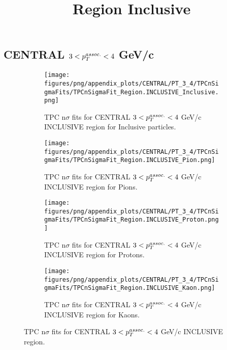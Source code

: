     
            \subsection{CENTRAL $3 < \pTassoc < 4$ GeV/c}
            \begin{figure}[H]
                \title{Region Inclusive}
                \begin{subfigure}[b]{0.5\textwidth}
                    \centering
                    \texttt{[image: figures/png/appendix\_plots/CENTRAL/PT\_3\_4/TPCnSigmaFits/TPCnSigmaFit\_Region.INCLUSIVE\_Inclusive.png]}
                    \caption{TPC n$\sigma$ fits for CENTRAL $3 < \pTassoc < 4$ GeV/c INCLUSIVE region for Inclusive particles.}
                    \label{fig:appendix_CENTRAL_$3 < \pTassoc < 4$ GeV/c_INCLUSIVE_Inclusive}
                \end{subfigure}
                \begin{subfigure}[b]{0.5\textwidth}
                    \centering
                    \texttt{[image: figures/png/appendix\_plots/CENTRAL/PT\_3\_4/TPCnSigmaFits/TPCnSigmaFit\_Region.INCLUSIVE\_Pion.png]}
                    \caption{TPC n$\sigma$ fits for CENTRAL $3 < \pTassoc < 4$ GeV/c INCLUSIVE region for Pions.}
                    \label{fig:appendix_CENTRAL_$3 < \pTassoc < 4$ GeV/c_INCLUSIVE_Pion}
                \end{subfigure}
                \begin{subfigure}[b]{0.5\textwidth}
                    \centering
                    \texttt{[image: figures/png/appendix\_plots/CENTRAL/PT\_3\_4/TPCnSigmaFits/TPCnSigmaFit\_Region.INCLUSIVE\_Proton.png]}
                    \caption{TPC n$\sigma$ fits for CENTRAL $3 < \pTassoc < 4$ GeV/c INCLUSIVE region for Protons.}
                    \label{fig:appendix_CENTRAL_$3 < \pTassoc < 4$ GeV/c_INCLUSIVE_Proton}
                \end{subfigure}
                \begin{subfigure}[b]{0.5\textwidth}
                    \centering
                    \texttt{[image: figures/png/appendix\_plots/CENTRAL/PT\_3\_4/TPCnSigmaFits/TPCnSigmaFit\_Region.INCLUSIVE\_Kaon.png]}
                    \caption{TPC n$\sigma$ fits for CENTRAL $3 < \pTassoc < 4$ GeV/c INCLUSIVE region for Kaons.}
                    \label{fig:appendix_CENTRAL_$3 < \pTassoc < 4$ GeV/c_INCLUSIVE_Kaon}
                \end{subfigure}
                \caption{TPC n$\sigma$ fits for CENTRAL $3 < \pTassoc < 4$ GeV/c INCLUSIVE region.}
                \label{fig:appendix_CENTRAL_$3 < \pTassoc < 4$ GeV/c_INCLUSIVE}
            \end{figure}
